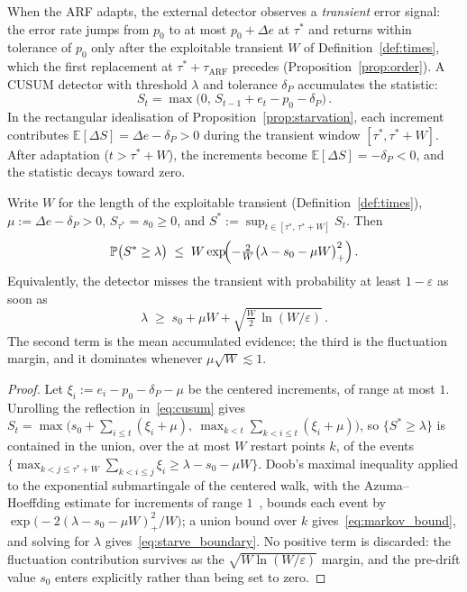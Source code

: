 \documentclass[smallextended]{svjour3}
\begin{document}
When the ARF adapts, the external detector observes a \emph{transient} error signal: the error rate jumps from $p_0$ to at most $p_0 + \Delta e$ at $\tau^*$ and returns within tolerance of $p_0$ only after the exploitable transient $W$ of Definition~\ref{def:times}, which the first replacement at $\tau^* + \tau_{\mathrm{ARF}}$ precedes (Proposition~\ref{prop:order}).
A CUSUM detector with threshold $\lambda$ and tolerance $\delta_P$ accumulates the statistic:
\begin{equation}\label{eq:cusum}
  S_t = \max\bigl(0,\, S_{t-1} + e_t - p_0 - \delta_P\bigr)\,.
\end{equation}
In the rectangular idealisation of Proposition~\ref{prop:starvation}, each increment contributes $\mathbb{E}[\Delta S] = \Delta e - \delta_P > 0$ during the transient window $[\tau^*, \tau^* + W]$.
After adaptation ($t > \tau^* + W$), the increments become $\mathbb{E}[\Delta S] = -\delta_P < 0$, and the statistic decays toward zero.

\begin{proposition}\label{prop:starvation}
  Write $W$ for the length of the exploitable transient (Definition~\ref{def:times}), $\mu := \Delta e - \delta_P > 0$, $S_{\tau^*} = s_0 \ge 0$, and $S^* := \sup_{t\in[\tau^*,\, \tau^* + W]} S_t$. Then
  \begin{equation}\label{eq:markov_bound}
    \mathbb{P}\bigl(S^* \ge \lambda\bigr) \;\le\; W \exp\!\Bigl(-\tfrac{2}{W}\bigl(\lambda - s_0 - \mu W\bigr)_{+}^{2}\Bigr)\,.
  \end{equation}
  Equivalently, the detector misses the transient with probability at least $1-\varepsilon$ as soon as
  \begin{equation}\label{eq:starve_boundary}
    \lambda \;\ge\; s_0 + \mu W + \sqrt{\tfrac{W}{2}\,\ln(W/\varepsilon)}\,.
  \end{equation}
  The second term is the mean accumulated evidence; the third is the fluctuation margin, and it dominates whenever $\mu\sqrt{W} \lesssim 1$.
\end{proposition}

\begin{proof}
  Let $\xi_i := e_i - p_0 - \delta_P - \mu$ be the centered increments, of range at most $1$. Unrolling the reflection in~\eqref{eq:cusum} gives $S_t = \max\bigl(s_0 + \sum_{i \le t}(\xi_i + \mu),\ \max_{k < t}\sum_{k < i \le t}(\xi_i + \mu)\bigr)$, so $\{S^* \ge \lambda\}$ is contained in the union, over the at most $W$ restart points $k$, of the events $\bigl\{\max_{k < j \le \tau^*+W}\sum_{k < i \le j}\xi_i \ge \lambda - s_0 - \mu W\bigr\}$. Doob's maximal inequality applied to the exponential submartingale of the centered walk, with the Azuma--Hoeffding estimate for increments of range $1$~\cite{hoeffding_1963,tartakovsky_2014}, bounds each event by $\exp\bigl(-2(\lambda - s_0 - \mu W)_{+}^{2}/W\bigr)$; a union bound over $k$ gives~\eqref{eq:markov_bound}, and solving for $\lambda$ gives~\eqref{eq:starve_boundary}. No positive term is discarded: the fluctuation contribution survives as the $\sqrt{W \ln(W/\varepsilon)}$ margin, and the pre-drift value $s_0$ enters explicitly rather than being set to zero.
\end{proof}
\end{document}
